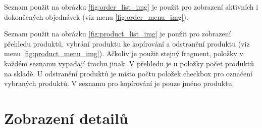 \documentclass[12pt]{report}
\begin{document}
Seznam použit na obrázku \ref{fig:order_list_img} je použit pro zobrazení aktivních i dokončených objednávek
(viz menu \ref{fig:order_menu_img}).

Seznam použit na obrázku \ref{fig:product_list_img} je použit pro zobrazení přehledu produktů, vybrání
produktu ke kopírování a odstranění produktu (viz menu \ref{fig:product_menu_img}).
Ačkoliv je použit stejný fragment, položky v každém seznamu 
vypadají trochu jinak. V přehledu je u položky počet produktů na skladě. U odstranění
produktů je místo počtu položek checkbox pro označení vybraných produktů. V seznamu
pro kopírování je pouze jméno produktu.
%
\section{Zobrazení detailů}
\begin{figure}[H]
	\centering
	\begin{subfigure}{.45\textwidth}
	  \centering

\end{subfigure}
\end{figure}
\end{document}
